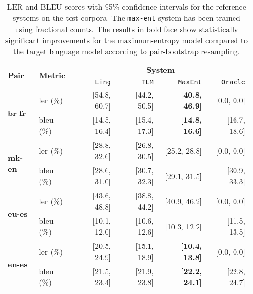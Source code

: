 \documentclass[11pt]{article}
\begin{document}
\begin{table*}
 \begin{center}

  \begin{tabular}{|l|l|r|r|r||r|}
    \hline
    \multirow{2}{*}{{\bf Pair}}  & \multirow{2}{*}{{\bf Metric}} & \multicolumn{4}{|c|}{{\bf System}} \\ \cline{3-6}
                                 &              & {\tt Ling} & {\tt TLM} & \texttt{MaxEnt} & \texttt{Oracle} \\
    \hline %
    \multirow{2}{*}{{\bf br-fr}} & {\sc ler} (\%)     & [54.8, 60.7] & [44.2, 50.5]  & {\bf [40.8, 46.9]} & [0.0, 0.0]      \\ 
                                 & {\sc bleu} (\%)    & [14.5, 16.4] & [15.4, 17.3]  & {\bf [14.8, 16.6]} & [16.7, 18.6]     \\ 
    \hline %
    \multirow{2}{*}{{\bf mk-en}} & {\sc ler} (\%)     & [28.8, 32.6] & [26.8, 30.5]  & [25.2, 28.8] & [0.0, 0.0]    \\ 
                                 & {\sc bleu} (\%)    & [28.6, 31.0] & [30.7, 32.3]  & [29.1, 31.5] & [30.9, 33.3]    \\ 
    \hline %
    \multirow{2}{*}{{\bf eu-es}} & {\sc ler} (\%)      & [43.6, 48.8] & [38.8, 44.2]  & [40.9, 46.2] & [0.0, 0.0]     \\ 
                                 & {\sc bleu} (\%)     & [10.1, 12.0] & [10.6, 12.6]  & [10.3, 12.2] & [11.5, 13.5]     \\ 
    \hline %
    \multirow{2}{*}{{\bf en-es}} & {\sc ler} (\%)      & [20.5, 24.9] & [15.1, 18.9]  & {\bf [10.4, 13.8]} & [0.0, 0.0]     \\ 
                                 & {\sc bleu} (\%)     & [21.5, 23.4] & [21.9, 23.8]  & {\bf [22.2, 24.1]} & [22.8, 24.7]     \\ 
    \hline
  \end{tabular}

 \end{center}
 \caption{LER and BLEU scores with 95\% confidence intervals for the reference
   systems on the test corpora. The \texttt{max-ent} system has been trained using 
   fractional counts. The results in bold face show statistically significant
   improvements for the maximum-entropy model compared to the target language model 
   according to pair-bootstrap resampling.}
  \label{table:eval-mono-results}
\end{table*}
\end{document}
